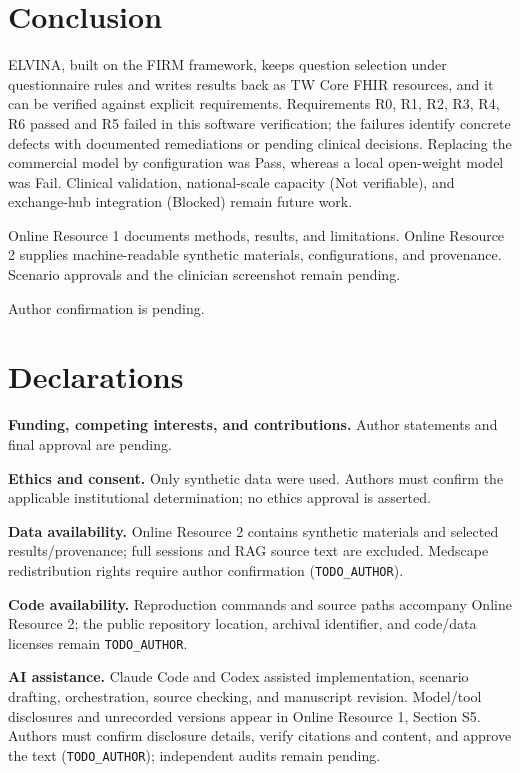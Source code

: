 \documentclass[lineno,pdflatex,sn-basic]{sn-jnl}%
\theoremstyle{thmstyleone}%
\theoremstyle{thmstyletwo}%
\theoremstyle{thmstylethree}%
\newcommand{\REightVerdict}{Not verifiable}
\newcommand{\RNineVerdict}{Blocked}
\newcommand{\EThreeAlternateSwapVerdict}{Pass}
\newcommand{\EThreeLocalSwapVerdict}{Fail}
\newcommand{\PassingRequirements}{R0, R1, R2, R3, R4, R6}
\newcommand{\FailingRequirements}{R5}
\begin{document}
\section{Conclusion}\label{sec:conclusion}
ELVINA, built on the FIRM framework, keeps question selection under
questionnaire rules and writes results back as TW Core FHIR resources, and it
can be verified against explicit requirements. Requirements \PassingRequirements{}
passed and \FailingRequirements{} failed in this software verification; the failures
identify concrete defects with documented remediations or pending clinical
decisions. Replacing the commercial model by configuration was
\EThreeAlternateSwapVerdict{}, whereas a local open-weight model was
\EThreeLocalSwapVerdict{}. Clinical validation, national-scale capacity
(\REightVerdict{}), and exchange-hub integration (\RNineVerdict{}) remain future work.

\backmatter
{}
Online Resource 1 documents methods, results, and limitations. Online Resource 2
supplies machine-readable synthetic materials, configurations, and provenance.
Scenario approvals and the clinician screenshot remain pending.

Author confirmation is pending.

\section*{Declarations}
\textbf{Funding, competing interests, and contributions.} Author statements and
final approval are pending.\par
\textbf{Ethics and consent.} Only synthetic data were used. Authors must confirm
the applicable institutional determination; no ethics approval is asserted.\par
\textbf{Data availability.} Online Resource 2 contains synthetic materials and
selected results/provenance; full sessions and RAG source text are excluded.
Medscape \citep{medscapeReference} redistribution rights require author confirmation
(\texttt{TODO\_AUTHOR}).\par
\textbf{Code availability.} Reproduction commands and source paths accompany
Online Resource 2; the public repository location, archival identifier, and code/data
licenses remain \texttt{TODO\_AUTHOR}.\par
\textbf{AI assistance.} Claude Code and Codex assisted implementation, scenario
drafting, orchestration, source checking, and manuscript revision. Model/tool
disclosures and unrecorded versions appear in Online Resource 1, Section S5.
Authors must confirm disclosure details, verify citations and content, and approve
the text (\texttt{TODO\_AUTHOR}); independent audits remain pending.


\end{document}
